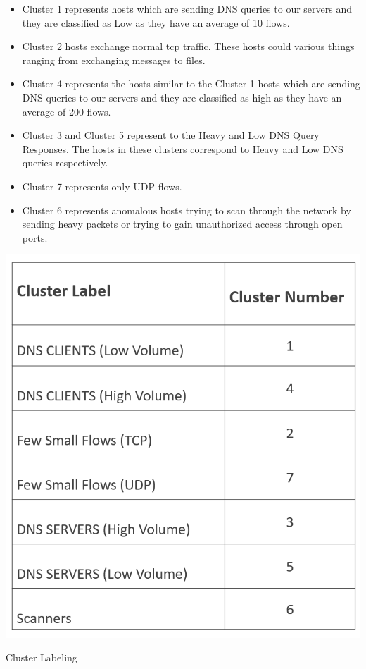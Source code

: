 \begin{itemize}
	\item Cluster 1 represents hosts which are sending DNS queries to our servers and they are classified as Low as they have an average of 10 flows. 
	
	\item Cluster 2 hosts exchange normal tcp traffic. These hosts could various things ranging from exchanging messages to files.
	
	\item Cluster 4 represents the hosts similar to the Cluster 1 hosts which are sending DNS queries to our servers and they are classified as high as they have an average of 200 flows.
	
	\item Cluster 3 and Cluster 5 represent to the Heavy and Low DNS Query Responses. The hosts in these clusters correspond to Heavy and Low DNS queries respectively.
	
	\item Cluster 7 represents only UDP flows.
	
	\item Cluster 6 represents anomalous hosts trying to scan through the network  by sending heavy packets or trying to gain unauthorized access through open ports. 
\end{itemize}



\begin{table}[ht]
	\centerline{\includegraphics[scale = 0.6]{cluster_label.png}}
	\caption{Cluster Labeling}%
\end{table}

